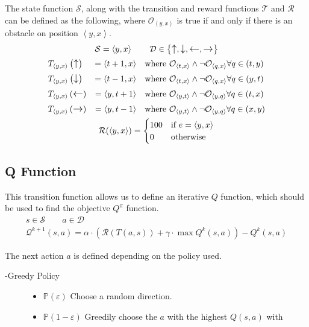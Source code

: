 \newcommand{\coor}[2]{\left\langle #1, #2 \right\rangle}
\newcommand{\yx}{\coor{y}{x}}
\newcommand{\obs}{\mathcal{O}}
\newcommand{\state}{\mathcal{S}}
\newcommand{\reward}{\mathcal{R}}
The state function $\state$, along with the transition and reward functions $\mathcal{T}$ and $\reward$ can be defined as the following, where $\obs_{\yx}$ is true if and only if there is an obstacle on position $\yx$.
\begin{gather*}
	\state = \yx \qquad \mathcal{D} \in \left\{ \upa, \downa, \lefta, \righta \right\} \\
	\begin{aligned}
		&T_{\yx}\left(\upa\right) &= \coor{t + 1}{x} &&&\text{where } \obs_{\coor{t}{x}} \wedge \neg \obs_{\coor{q}{x}} \forall q \in \left(t, y\right) \\
		&T_{\yx}\left(\downa\right) &= \coor{t - 1}{x} &&&\text{where } \obs_{\coor{t}{x}} \wedge \neg \obs_{\coor{q}{x}} \forall q \in \left(y, t\right) \\
		&T_{\yx}\left(\lefta\right) &= \coor{y}{t + 1} &&&\text{where } \obs_{\coor{y}{t}} \wedge \neg \obs_{\coor{y}{q}} \forall q \in \left(t, x\right) \\
		&T_{\yx}\left(\righta\right) &= \coor{y}{t - 1} &&&\text{where } \obs_{\coor{y}{t}} \wedge \neg \obs_{\coor{y}{q}} \forall q \in \left(x, y\right)
	\end{aligned} \\
	\reward(\yx) = \begin{cases}
		100 & \text{if } e = \yx \\
		0 & \text{otherwise}
	\end{cases}
\end{gather*}

\subsection{Q Function}

This transition function allows us to define an iterative $Q$ function, which should be used to find the objective $Q^\pi$ function.
\begin{gather*}
	s \in \mathcal{S} \qquad a \in \mathcal{D} \\
	\mathcal{Q}^{k + 1}(s, a) = \alpha \cdot \left( \reward( T( a, s ) ) + \gamma \cdot \max{Q^k(s, a)} \right) - Q^k(s, a)
\end{gather*}

\newpage{}
The next action $a$ is defined depending on the policy used.
\begin{description}
	\item[\textepsilon-Greedy Policy] \phantom{x}
		\begin{itemize}
			\item $\mathbb{P}(\varepsilon)$ \qquad Choose a random direction.
			\item $\mathbb{P}(1 - \varepsilon)$ \quad Greedily choose the $a$ with the highest $Q(s, a)$ with 
		\end{itemize}
\end{description}
